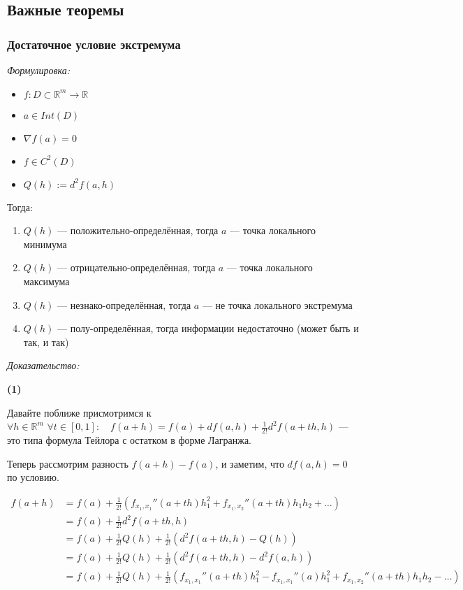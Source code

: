 \documentclass{article}
\def\dbl{\,\,}
\begin{document}
\newpage
\subsection{Важные теоремы}
\subsubsection{Достаточное условие экстремума}

\textit{Формулировка:}
\begin{itemize}
    \item $f: D \subset \mathbb{R}^m \rightarrow \mathbb{R}$
    \item $a \in Int(D)$
    \item $\nabla f (a) = 0$
    \item $f \in C^2(D)$
    \item $Q(h) := d^2f(a, h)$
\end{itemize}

Тогда: 

\begin{enumerate}
    \item $Q(h)$ --- положительно-определённая, тогда $a$ --- точка локального минимума
    \item $Q(h)$ --- отрицательно-определённая, тогда $a$ --- точка локального максимума
    \item $Q(h)$ --- незнако-определённая, тогда $a$ --- не точка локального экстремума
    \item $Q(h)$ --- полу-определённая, тогда информации недостаточно (может быть и так, и так)
\end{enumerate}


\textit{Доказательство:}

\textbf{(1)}

Давайте поближе присмотримся к $\forall h \in \mathbb{R}^m \dbl \forall t \in [0, 1]: \quad f(a + h) = f(a) + df(a, h) + \frac{1}{2!}d^2f(a + th, h)$ --- это типа формула Тейлора с остатком в форме Лагранжа.

Теперь рассмотрим разность $f(a + h) - f(a)$, и заметим, что $df(a, h) = 0$ по условию.

\begin{align*}
    f(a + h) &= f(a) + \frac{1}{2!}(f_{x_1, x_1}''(a+th)h_1^2 + f_{x_1, x_2}''(a + th)h_1h_2 + \ldots) \\
    &= f(a) + \frac{1}{2!}d^2f(a + th, h) \\
    &= f(a) + \frac{1}{2!}Q(h) + \frac{1}{2!}(d^2f(a + th, h) - Q(h))\\
    &= f(a) + \frac{1}{2!}Q(h) + \frac{1}{2!}(d^2f(a + th, h) - d^2f(a, h))\\
    &= f(a) + \frac{1}{2!}Q(h) + \frac{1}{2!}(f_{x_1, x_1}''(a+th)h_1^2 - f_{x_1, x_1}''(a)h_1^2 + f_{x_1, x_2}''(a + th)h_1h_2 - \ldots)
\end{align*}
\end{document}
